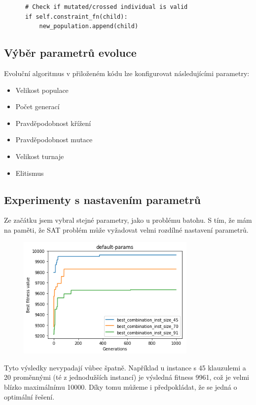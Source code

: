 \documentclass[a4paper,10pt,twocolumn]{article}
\begin{document}
\begin{itemize}
\begin{itemize}
\begin{verbatim}
      # Check if mutated/crossed individual is valid
      if self.constraint_fn(child):
          new_population.append(child)
   \end{verbatim}


\subsection{Výběr parametrů evoluce}

Evoluční algoritmus v přiloženém kódu lze konfigurovat následujícími parametry:
\begin{itemize}

   \item Velikost populace
   \item Počet generací
   \item Pravděpodobnost křížení
   \item Pravděpodobnost mutace
   \item Velikost turnaje
   \item Elitismus
\end{itemize}




\subsection{Experimenty s nastavením parametrů}


Ze začátku jsem vybral stejné parametry, jako u problému batohu. S tím, že mám na paměti, že SAT problém může vyžadovat velmi rozdílné nastavení parametrů.


\begin{figure}[H]
  \begin{center}
    \includegraphics[height=6cm]{graphs/default-params.png}
  \end{center}
\end{figure}


Tyto výsledky nevypadají vůbec špatně. Například u instance s 45 klauzulemi a 20 proměnnými (té z jednodužších instancí) je výsledná fitness 9961,  což je velmi blízko maximálnímu 10000. Díky tomu můžeme i předpokládat, že se jedná o optimální řešení. 


\end{itemize}
\end{itemize}
\end{document}
